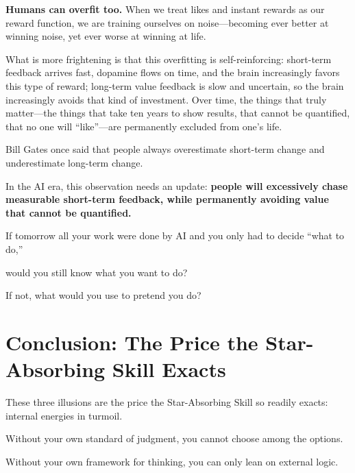 \vspace{1em}

\textbf{Humans can overfit too.} When we treat likes and instant rewards as our reward function, we are training ourselves on noise---becoming ever better at winning noise, yet ever worse at winning at life.

\vspace{1em}

What is more frightening is that this overfitting is self-reinforcing: short-term feedback arrives fast, dopamine flows on time, and the brain increasingly favors this type of reward; long-term value feedback is slow and uncertain, so the brain increasingly avoids that kind of investment. Over time, the things that truly matter---the things that take ten years to show results, that cannot be quantified, that no one will ``like''---are permanently excluded from one's life.

\vspace{1em}

Bill Gates once said that people always overestimate short-term change and underestimate long-term change.

In the AI era, this observation needs an update: \textbf{people will excessively chase measurable short-term feedback, while permanently avoiding value that cannot be quantified.}

\begin{thinkbox}[Reflection]
If tomorrow all your work were done by AI and you only had to decide ``what to do,''

would you still know what you want to do?

If not, what would you use to pretend you do?
\end{thinkbox}

\newpage
\section{Conclusion: The Price the Star-Absorbing Skill Exacts}

These three illusions are the price the Star-Absorbing Skill so readily exacts: internal energies in turmoil.

Without your own standard of judgment, you cannot choose among the options.

Without your own framework for thinking, you can only lean on external logic.

